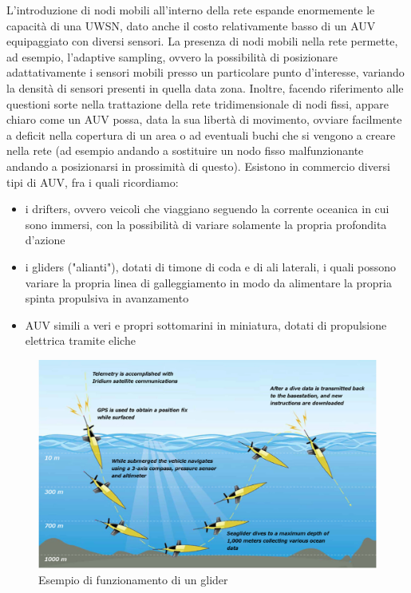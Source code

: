 \documentclass[Lau,binding=0.6cm]{sapthesis}
\begin{document}
L'introduzione di nodi mobili all'interno della rete espande enormemente le capacità di una UWSN, dato anche il costo relativamente basso di un AUV equipaggiato con diversi sensori. La presenza di nodi mobili nella rete permette, ad esempio, l'adaptive sampling, ovvero la possibilità di posizionare adattativamente i sensori mobili presso un particolare punto d'interesse, variando la densità di sensori presenti in quella data zona. Inoltre, facendo riferimento alle questioni sorte nella trattazione della rete tridimensionale di nodi fissi, appare chiaro come un AUV possa, data la sua libertà di movimento, ovviare facilmente a deficit nella copertura di un area o ad eventuali buchi che si vengono a creare nella rete (ad esempio andando a sostituire un nodo fisso malfunzionante andando a posizionarsi in prossimità di questo).
Esistono in commercio diversi tipi di AUV, fra i quali ricordiamo:
\begin{itemize}

\item i drifters, ovvero veicoli che viaggiano seguendo la corrente oceanica in cui sono immersi, con la possibilità di variare solamente la propria
profondita d'azione

\item i gliders ("alianti"), dotati di timone di coda e di ali laterali, i quali possono variare la propria linea di galleggiamento in modo da alimentare la propria spinta propulsiva in avanzamento

\item AUV simili a veri e propri sottomarini in miniatura, dotati di propulsione elettrica tramite eliche

\end{itemize}
\begin{figure}[H]
    \centering
	\includegraphics[width=\linewidth]{glider.jpg}
	\caption{ Esempio di funzionamento di un glider}
	\label{fig:}
\end{figure}
\end{document}
